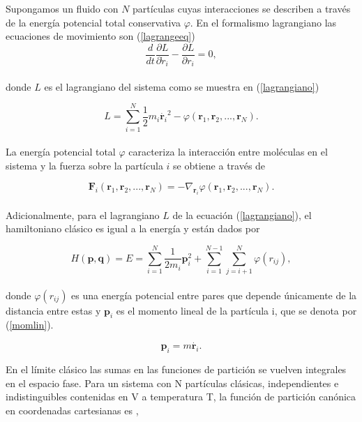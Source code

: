 Supongamos un fluido con $N$ partículas cuyas interacciones se describen a través de la energía potencial total conservativa $\varphi$. En el formalismo lagrangiano las ecuaciones de movimiento son (\ref{lagrangeeq}) \cite{torresdelcastillo_2018}\\

\begin{equation} \label{lagrangeeq}
    \frac{d}{dt}\frac{\partial L}{\partial \dot r_i} - \frac{\partial L}{\partial r_i} = 0,
\end{equation}\\
donde $L$ es el lagrangiano del sistema como se muestra en (\ref{lagrangiano})

\begin{equation} \label{lagrangiano}
    L = \sum_{i=1}^{N} \frac{1}{2}m_i\dot{\mathbf{r}_i}^2-\varphi \left({\mathbf{r}}_1,{\mathbf{r}}_2,...,{\mathbf{r}}_N\right).
\end{equation}\\
La energía potencial total $\varphi$ caracteriza la interacción entre moléculas en el sistema \cite{torresdelcastillo_2018} y la fuerza sobre la partícula $i$ se obtiene a través de

\begin{equation}
    \mathbf{F}_i({\mathbf{r}}_1,{\mathbf{r}}_2,...,{\mathbf{r}}_N) = -\nabla_{\mathbf{r}_i}\varphi({\mathbf{r}}_1,{\mathbf{r}}_2,...,{\mathbf{r}}_N).
\end{equation}\\

Adicionalmente, para el lagrangiano $L$ de la ecuación (\ref{lagrangiano}), el hamiltoniano clásico es igual a la energía y están dados por

\begin{equation} \label{hamiltoniano}
    H(\mathbf{p},\mathbf{q}) = E = \sum_{i=1}^{N} \frac{1}{2 m_i}\mathbf{p}_i^2 + \sum_{i=1}^{N-1}\sum_{j=i+1}^{N} \varphi(r_{ij}),
\end{equation}\\

\noindent donde $\varphi(r_{ij})$ es una energía potencial entre pares que depende únicamente de la distancia entre estas y $\mathbf{p}_i$ es el momento lineal de la partícula i, que se denota por (\ref{momlin}).

\begin{equation}\label{momlin}
    \mathbf{p}_i = m\dot{\mathbf{r}_i}.
\end{equation}

En el límite clásico las sumas en las funciones de partición se vuelven integrales en el espacio fase. Para un sistema con N partículas clásicas, independientes e indistinguibles contenidas en V a temperatura T, la función de partición canónica en coordenadas cartesianas es \cite{mcquarrie1976},

